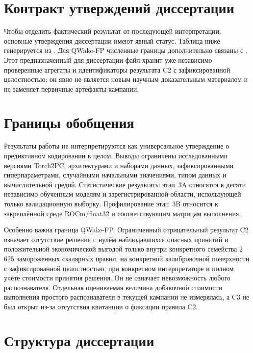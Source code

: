\section{Контракт утверждений диссертации}
\label{sec:intro-claims}

Чтобы отделить фактический результат от последующей интерпретации, основные
утверждения диссертации имеют явный статус. Таблица ниже генерируется из
. Для QWake-FP численные границы
дополнительно связаны с . Этот
предназначенный для диссертации файл хранит уже независимо проверенные агрегаты
и идентификаторы результата C2 с зафиксированной целостностью; он явно не
является новым научным доказательным материалом и не заменяет первичные
артефакты кампании.



\section{Границы обобщения}
\label{sec:intro-scope}

Результаты работы не интерпретируются как универсальное утверждение о
предиктивном кодировании в целом. Выводы ограничены исследованными версиями
Torch2PC, архитектурами и наборами данных, зафиксированными гиперпараметрами,
случайными начальными значениями, типом данных и вычислительной средой.
Статистические результаты этап~3A относятся к десяти независимо обученным
моделям и зарегистрированной области, использующей только валидационную
выборку. Профилирование этап~3B относится к закреплённой среде ROCm/float32 и
соответствующим матрицам выполнения.

Особенно важна граница QWake-FP. Ограниченный отрицательный результат C2 означает
отсутствие решения с нулём наблюдавшихся опасных принятий и положительной
экономической выгодой только внутри
конкретного семейства 2\,625 замороженных скалярных правил, на конкретной
калибровочной поверхности с зафиксированной целостностью, при конкретном
интерпретаторе и полном учёте стоимости принятия решения. Он не означает
невозможность любого распознавателя. Отдельная оцениваемая величина добавочной
стоимости выполнения простого распознавателя в текущей кампании не измерялась,
а C3 не был открыт из-за отсутствия квитанции о фиксации правила C2.

\section{Структура диссертации}

